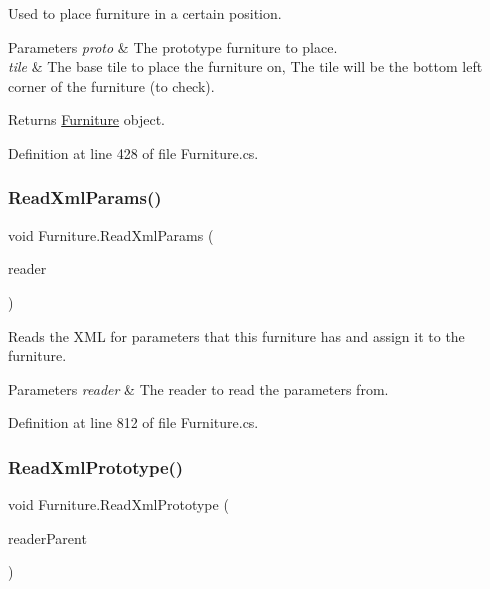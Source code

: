 Used to place furniture in a certain position. 


\begin{DoxyParams}{Parameters}
{\em proto} & The prototype furniture to place.\\
\hline
{\em tile} & The base tile to place the furniture on, The tile will be the bottom left corner of the furniture (to check).\\
\hline
\end{DoxyParams}
\begin{DoxyReturn}{Returns}
\hyperlink{class_furniture}{Furniture} object.
\end{DoxyReturn}


Definition at line 428 of file Furniture.\+cs.

\mbox{\label{class_furniture_a810a91747971fea72daee137e8aab9f5}} 
\subsubsection{\texorpdfstring{Read\+Xml\+Params()}{ReadXmlParams()}}
{\footnotesize\ttfamily void Furniture.\+Read\+Xml\+Params (\begin{DoxyParamCaption}\item[{Xml\+Reader}]{reader }\end{DoxyParamCaption})}



Reads the X\+ML for parameters that this furniture has and assign it to the furniture. 


\begin{DoxyParams}{Parameters}
{\em reader} & The reader to read the parameters from.\\
\hline
\end{DoxyParams}


Definition at line 812 of file Furniture.\+cs.

\mbox{\label{class_furniture_a28d8b4c5024c93c5d4da4879ce6c2f2b}} 
\subsubsection{\texorpdfstring{Read\+Xml\+Prototype()}{ReadXmlPrototype()}}
{\footnotesize\ttfamily void Furniture.\+Read\+Xml\+Prototype (\begin{DoxyParamCaption}\item[{Xml\+Reader}]{reader\+Parent }\end{DoxyParamCaption})}



